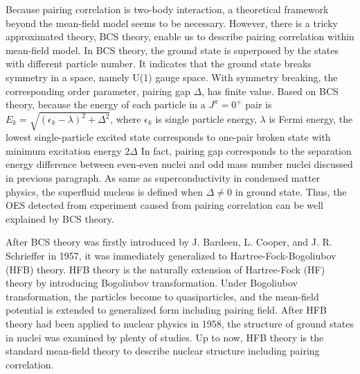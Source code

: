 \documentclass[11pt]{book} %
\begin{document}
Because pairing correlation is two-body interaction, a theoretical framework beyond the mean-field model seems to be necessary. However, there is a tricky approximated theory, BCS theory, enable us to describe pairing correlation within mean-field model. In BCS theory, the ground state is superposed by the states with different particle number. It indicates that the ground state breaks symmetry in a space, namely U(1) gauge space. With symmetry breaking, the corresponding order parameter, pairing gap $\Delta$, has finite value. Based on BCS theory, because the energy of each particle in a $J^{\pi}=0^+$ pair is $E_k=\sqrt{(\epsilon_k-\lambda)^2+\Delta^2}$, where $\epsilon_k$ is single particle energy, $\lambda$ is Fermi energy, the lowest single-particle excited state corresponds to one-pair broken state with minimum excitation energy $2\Delta$ In fact, pairing gap corresponds to the separation energy difference between even-even nuclei and odd mass number nuclei discussed in previous paragraph. As same as superconductivity in condensed matter physics, the superfluid nucleus is defined when $\Delta\neq0$ in ground state. Thus, the OES detected from experiment caused from pairing correlation can be well explained by BCS theory.

After BCS theory was firstly introduced by J. Bardeen, L. Cooper, and J. R. Schrieffer in 1957, it was immediately generalized to Hartree-Fock-Bogoliubov (HFB) theory. HFB theory is the naturally extension of Hartree-Fock (HF) theory by introducing Bogoliubov transformation. Under Bogoliubov transformation, the particles become to quasiparticles, and the mean-field potential is extended to generalized form including pairing field. After HFB theory had been applied to nuclear physics in 1958, the structure of ground states in nuclei was examined by plenty of studies. Up to now, HFB theory is the standard mean-field theory to describe nuclear structure including pairing correlation.


\end{document}
